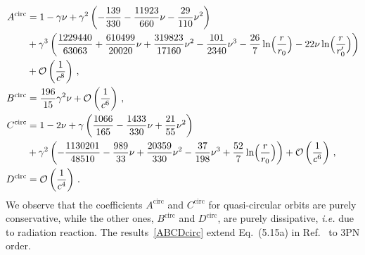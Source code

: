 \documentclass[prd,preprint,superscriptaddress,tightenlines,nofootinbib,
  eqsecnum,showpacs]{revtex4}
\begin{document}
\begin{subequations}\label{ABCDcirc}
\begin{align}
A^\text{circ} &= 1 -\gamma \nu + \gamma^2 \left( - \frac{139}{330} -
\frac{11923}{660}\nu - \frac{29}{110}\nu^2\right) \nonumber \\ & +
\gamma^3 \left( \frac{1229440}{63063} + \frac{610499}{20020} \nu +
\frac{319823}{17160} \nu^2 - \frac{101}{2340} \nu^3 - \frac{26}{7} \ln
\Bigl(\frac{r}{r_0}\Bigr) - 22 \nu \ln \Bigl(\frac{r}{r'_{0}}\Bigr)
\right) \nonumber \\ & + \mathcal{O}\left(\frac{1}{c^8}\right)\,,\\
B^\text{circ} &= \frac{196}{15}\gamma^2 \nu +
\mathcal{O}\left(\frac{1}{c^6}\right)\,,\\
C^\text{circ} &= 1 - 2\nu +
\gamma \left(\frac{1066}{165} - \frac{1433}{330}\nu + \frac{21}{55}
\nu^2\right) \nonumber \\ & + \gamma^2 \left( - \frac{1130201}{48510}
- \frac{989}{33} \nu + \frac{20359}{330} \nu^2 - \frac{37}{198} \nu^3
+ \frac{52}{7} \ln \Bigl(\frac{r}{r_0}\Bigr)\right) +
\mathcal{O}\left(\frac{1}{c^6}\right)\,,\\
D^\text{circ} &= \mathcal{O}\left(\frac{1}{c^4}\right)\,.
\end{align}
\end{subequations}
%
We observe that the coefficients $A^\text{circ}$ and $C^\text{circ}$
for quasi-circular orbits are purely conservative, while the other
ones, $B^\text{circ}$ and $D^\text{circ}$, are purely dissipative,
\textit{i.e.} due to radiation reaction. The results~\eqref{ABCDcirc}
extend Eq.~(5.15a) in Ref.~\cite{BFIS08} to 3PN order.
\end{document}
